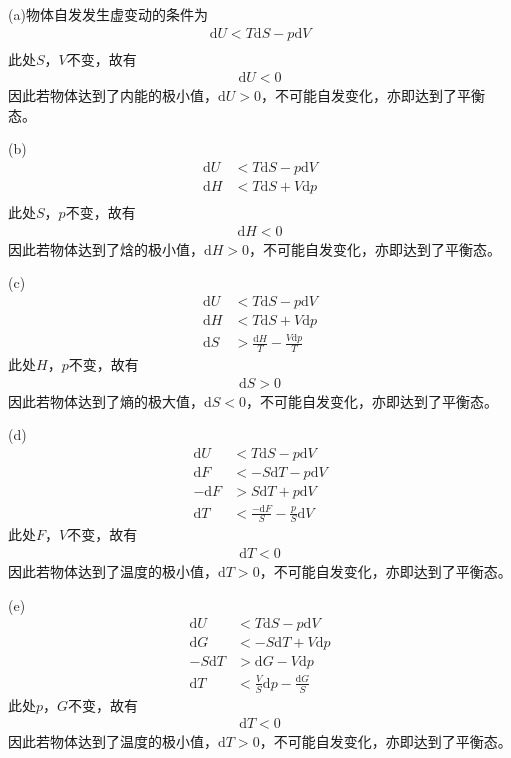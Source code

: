 \documentclass{phyasgn}
\renewcommand{\d}{\mathrm{d}}
\begin{document}
\begin{sol}[1]
    (a)物体自发发生虚变动的条件为
    \begin{align*}
        \d U<T\d S-p\d V\\
    \end{align*}
    此处$S$，$V$不变，故有
    \begin{align*}
        \d U<0
    \end{align*}
    因此若物体达到了内能的极小值，$\d U>0$，不可能自发变化，亦即达到了平衡态。

    (b)\begin{align*}
        \d U&<T\d S-p\d V\\
        \d H&<T\d S+V\d p\\
    \end{align*}
    此处$S$，$p$不变，故有
    \begin{align*}
        \d H<0
    \end{align*}
    因此若物体达到了焓的极小值，$\d H>0$，不可能自发变化，亦即达到了平衡态。

    (c)\begin{align*}
        \d U&<T\d S-p\d V\\
        \d H&<T\d S+V\d p\\
        \d S&>\frac{\d H}{T}-\frac{V\d p}{T}
    \end{align*}
    此处$H$，$p$不变，故有
    \begin{align*}
        \d S>0
    \end{align*}
    因此若物体达到了熵的极大值，$\d S<0$，不可能自发变化，亦即达到了平衡态。

    (d)\begin{align*}
        \d U&<T\d S-p\d V\\
        \d F&<-S\d T-p\d V\\
        -\d F&>S\d T+p\d V\\
        \d T&<\frac{-\d F}{S}-\frac{p}{S}\d V
    \end{align*}
    此处$F$，$V$不变，故有
    \begin{align*}
        \d T<0
    \end{align*}
    因此若物体达到了温度的极小值，$\d T>0$，不可能自发变化，亦即达到了平衡态。

    (e)\begin{align*}
        \d U&<T\d S-p\d V\\
        \d G&<-S\d T+V\d p\\
        -S\d T&>\d G-V\d p\\
        \d T&<\frac{V}{S}\d p-\frac{\d G}{S}
    \end{align*}
    此处$p$，$G$不变，故有
    \begin{align*}
        \d T<0
    \end{align*}
    因此若物体达到了温度的极小值，$\d T>0$，不可能自发变化，亦即达到了平衡态。


\end{sol}
\end{document}
